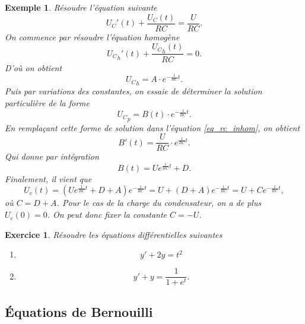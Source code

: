 \documentclass[a4paper,12pt]{book}
\newtheorem*{exemple}{Exemple}
\newtheorem*{exercice}{Exercice}
\begin{document}
\begin{exemple}
 Résoudre l'équation suivante
\begin{equation}
 U_C'(t)+\frac{U_C(t)}{RC}=\frac{U}{RC}.\label{eq_rc_inhom}
\end{equation}
On commence par résoudre l'équation homogène
\begin{equation}
 {U_C}_h'(t)+\frac{{U_C}_h(t)}{RC}=0.
\end{equation}
D'où on obtient
\begin{equation}
 {U_C}_h=A\cdot e^{-\frac{1}{RC} t}.
\end{equation}
Puis par variations des constantes, on essaie de déterminer la solution particulière de la forme
\begin{equation}
 {U_C}_p=B(t)\cdot e^{-\frac{1}{RC} t}.
\end{equation}
En remplaçant cette forme de solution dans l'équation \eqref{eq_rc_inhom}, on obtient 
\begin{equation}
 B'(t)=\frac{U}{RC}\cdot e^{\frac{1}{RC} t}.
\end{equation}
Qui donne par intégration
\begin{equation}
 B(t)=U e^{\frac{1}{RC} t}+D.
\end{equation}
Finalement, il vient que
\begin{equation}
 U_c(t)=\left(U e^{\frac{1}{RC} t}+D+A\right)e^{-\frac{1}{RC}t}=U+(D+A)e^{-\frac{1}{RC}t}=U+Ce^{-\frac{1}{RC}t},
\end{equation}
où $C=D+A$. Pour le cas de la charge du condensateur, on a de plus 
$U_c(0)=0$. On peut donc fixer la constante $C=-U$.
\end{exemple}

\begin{exercice}
Résoudre les équations différentielles suivantes
\begin{enumerate}
 \item 
 \begin{equation}
  y'+2y=t^2
 \end{equation}
 \item 
 \begin{equation}
  y'+y=\frac{1}{1+e^t}.
 \end{equation}

\end{enumerate}

\end{exercice}

\subsection{Équations de Bernouilli}
\end{document}
